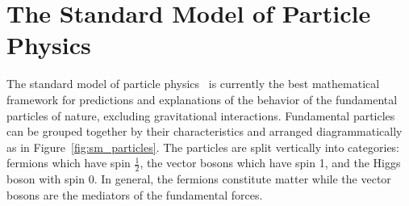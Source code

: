 


\section{The Standard Model of Particle Physics}
The standard model of particle physics~\cite{Glashow:1961tr,SM1,SM3} is currently
the best mathematical framework for predictions and explanations of the behavior
of the fundamental particles of nature, excluding gravitational interactions. Fundamental particles can be grouped
together by their characteristics and arranged diagrammatically as in
Figure~\ref{fig:sm_particles}. The particles are split vertically into categories:
fermions which have spin $\frac{1}{2}$, the vector bosons which have spin 1, and
the Higgs boson with spin 0. In general, the fermions constitute 
matter while the vector bosons are the mediators of the fundamental forces.

